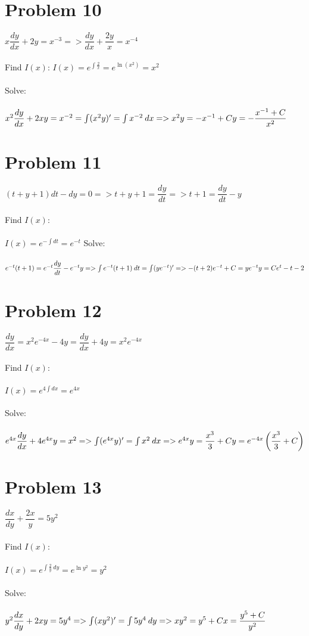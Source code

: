 \documentclass[12pt]{exam}
\begin{document}
\section*{Problem 10}
$x\dfrac{dy}{dx}+2y=x^{-3}=>\dfrac{dy}{dx}+\dfrac{2y}{x}=x^{-4}$\\\\
Find $I(x)$:
$I(x)=e^{\int\frac{2}{x}}=e^{\ln{(x^2)}}=x^2$\\\\
Solve:\\\\
$x^2\dfrac{dy}{dx}+2xy=x^{-2}=\int(x^2y)'=\int x^{-2}\:dx=>x^2y=-x^{-1}+C\\\\y=-\dfrac{x^{-1}+C}{x^2}$
\pagebreak
\section*{Problem 11}
$(t+y+1)dt-dy=0=>t+y+1=\dfrac{dy}{dt}=>t+1=\dfrac{dy}{dt}-y$\\\\
Find $I(x)$:\\\\
$I(x)=e^{-\int dt}=e^{-t}$
Solve:\\\\
$e^{-t}(t+1)=e^{-t}\dfrac{dy}{dt}-e^{-t}y=>\int e^{-t}(t+1)\:dt=\int(ye^{-t})'=>-(t+2)e^{-t}+C=ye^{-t}\\\\y=Ce^{t}-t-2$
\section*{Problem 12}
$\dfrac{dy}{dx}=x^2e^{-4x}-4y=\dfrac{dy}{dx}+4y=x^2e^{-4x}$\\\\
Find $I(x)$:\\\\
$I(x)=e^{4\int dx}=e^{4x}$\\\\
Solve:\\\\
$e^{4x}\dfrac{dy}{dx}+4e^{4x}y=x^2=>\int(e^{4x}y)'=\int x^2\:dx=>e^{4x}y=\dfrac{x^3}{3}+C\\\\y=e^{-4x}\left(\dfrac{x^3}{3}+C\right)$
\section*{Problem 13}
$\dfrac{dx}{dy}+\dfrac{2x}{y}=5y^2$\\\\
Find $I(x)$:\\\\
$I(x)=e^{\int\frac{2}{y}\:dy}=e^{\ln{y^2}}=y^2$\\\\
Solve:\\\\
$y^2\dfrac{dx}{dy}+2xy=5y^4=>\int(xy^2)'=\int5y^4\:dy=>xy^2=y^5+C\\\\x=\dfrac{y^5+C}{y^2}$
\end{document}
